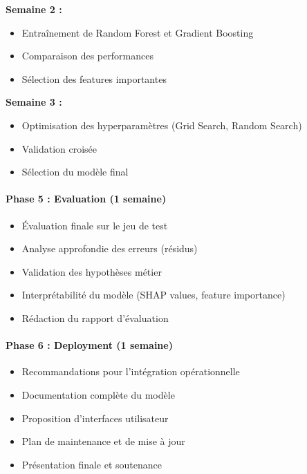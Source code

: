 \documentclass[12pt,a4paper]{article}
\begin{document}
\textbf{Semaine 2 :}
\begin{itemize}[leftmargin=*]
    \item Entraînement de Random Forest et Gradient Boosting
    \item Comparaison des performances
    \item Sélection des features importantes
\end{itemize}

\textbf{Semaine 3 :}
\begin{itemize}[leftmargin=*]
    \item Optimisation des hyperparamètres (Grid Search, Random Search)
    \item Validation croisée
    \item Sélection du modèle final
\end{itemize}

\paragraph{Phase 5 : Evaluation (1 semaine)}

\begin{itemize}[leftmargin=*]
    \item Évaluation finale sur le jeu de test
    \item Analyse approfondie des erreurs (résidus)
    \item Validation des hypothèses métier
    \item Interprétabilité du modèle (SHAP values, feature importance)
    \item Rédaction du rapport d'évaluation
\end{itemize}

\paragraph{Phase 6 : Deployment (1 semaine)}

\begin{itemize}[leftmargin=*]
    \item Recommandations pour l'intégration opérationnelle
    \item Documentation complète du modèle
    \item Proposition d'interfaces utilisateur
    \item Plan de maintenance et de mise à jour
    \item Présentation finale et soutenance
\end{itemize}
\end{document}
